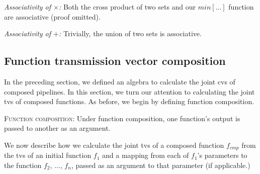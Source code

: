 \vspace{3mm}
\textit{Associativity of $\times$:} Both the cross product of two sets and our $min[...]$ function are associative (proof omitted).

\vspace{3mm}
\textit{Associativity of $+$:} Trivially, the union of two sets is associative.

\subsection{Function transmission vector composition}
In the preceding section, we defined an algebra to calculate the joint cvs of composed pipelines. In this section, we turn our attention to calculating the joint tvs of composed functions. As before, we begin by defining function composition.

\vspace{3mm}
\textsc{Function composition:} Under function composition, one function's output is passed to another as an argument.

 We now describe how we calculate the joint tvs of a composed function $f_{cmp}$ from the tvs of an initial function $f_1$ and a mapping from each of $f_1$'s parameters to the function $f_2$, ..., $f_n$, passed as an argument to that parameter (if applicable.)

